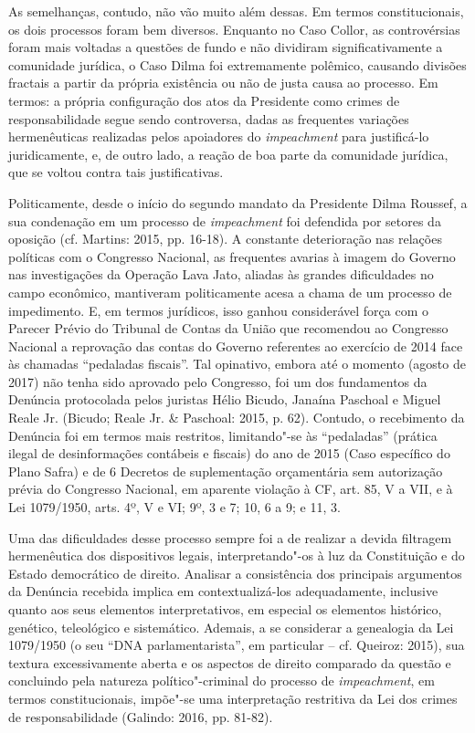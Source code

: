 As semelhanças, contudo, não vão muito além dessas. Em termos
constitucionais, os dois processos foram bem diversos. Enquanto no Caso
Collor, as controvérsias foram mais voltadas a questões de fundo e não
dividiram significativamente a comunidade jurídica, o Caso Dilma foi
extremamente polêmico, causando divisões fractais a partir da própria
existência ou não de justa causa ao processo. Em termos: a própria
configuração dos atos da Presidente como crimes de responsabilidade
segue sendo controversa, dadas as frequentes variações hermenêuticas
realizadas pelos apoiadores do \emph{impeachment} para justificá-lo
juridicamente, e, de outro lado, a reação de boa parte da comunidade
jurídica, que se voltou contra tais justificativas.

Politicamente, desde o início do segundo mandato da Presidente Dilma
Roussef, a sua condenação em um processo de \emph{impeachment} foi
defendida por setores da oposição (cf. Martins: 2015, pp. 16-18). A
constante deterioração nas relações políticas com o Congresso Nacional,
as frequentes avarias à imagem do Governo nas investigações da Operação
Lava Jato, aliadas às grandes dificuldades no campo econômico,
mantiveram politicamente acesa a chama de um processo de impedimento. E,
em termos jurídicos, isso ganhou considerável força com o Parecer Prévio
do Tribunal de Contas da União que recomendou ao Congresso Nacional a
reprovação das contas do Governo referentes ao exercício de 2014 face às
chamadas ``pedaladas fiscais''. Tal opinativo, embora até o momento
(agosto de 2017) não tenha sido aprovado pelo Congresso, foi um dos
fundamentos da Denúncia protocolada pelos juristas Hélio Bicudo, Janaína
Paschoal e Miguel Reale Jr. (Bicudo; Reale Jr. \& Paschoal: 2015, p.
62). Contudo, o recebimento da Denúncia foi em termos mais restritos,
limitando"-se às ``pedaladas'' (prática ilegal de desinformações
contábeis e fiscais) do ano de 2015 (Caso específico do Plano Safra) e
de 6 Decretos de suplementação orçamentária sem autorização prévia do
Congresso Nacional, em aparente violação à CF, art. 85, V a VII, e à Lei
1079/1950, arts. 4º, V e VI; 9º, 3 e 7; 10, 6 a 9; e 11, 3.

Uma das dificuldades desse processo sempre foi a de realizar a devida
filtragem hermenêutica dos dispositivos legais, interpretando"-os à luz
da Constituição e do Estado democrático de direito. Analisar a
consistência dos principais argumentos da Denúncia recebida implica em
contextualizá-los adequadamente, inclusive quanto aos seus elementos
interpretativos, em especial os elementos histórico, genético,
teleológico e sistemático. Ademais, a se considerar a genealogia da Lei
1079/1950 (o seu ``DNA parlamentarista'', em particular -- cf. Queiroz:
2015), sua textura excessivamente aberta e os aspectos de direito
comparado da questão e concluindo pela natureza político"-criminal do
processo de \emph{impeachment}, em termos constitucionais, impõe"-se uma
interpretação restritiva da Lei dos crimes de responsabilidade (Galindo:
2016, pp. 81-82).

